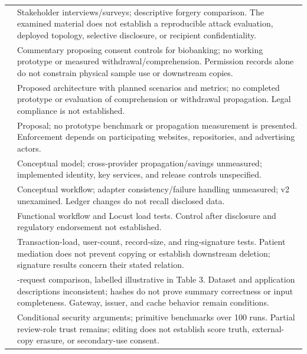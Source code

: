 \begin{longtable}{@{}>{\raggedright\arraybackslash}m{}>{\raggedright\arraybackslash}m{}@{}}
\addlinespace[5pt]
\cite{updateGupta2024CertificatePermission} & Stakeholder interviews/surveys; descriptive forgery comparison. The examined material does not establish a reproducible attack evaluation, deployed topology, selective disclosure, or recipient confidentiality. \\
\addlinespace[5pt]
\cite{updateBarnes2025DemonstratedConsent} & Commentary proposing consent controls for biobanking; no working prototype or measured withdrawal/comprehension. Permission records alone do not constrain physical sample use or downstream copies. \\
\addlinespace[5pt]
\cite{updateBonotis2025CONSENT} & Proposed architecture with planned scenarios and metrics; no completed prototype or evaluation of comprehension or withdrawal propagation. Legal compliance is not established. \\
\addlinespace[5pt]
\cite{updateDauden2025RTBConsent} & Proposal; no prototype benchmark or propagation measurement is presented. Enforcement depends on participating websites, repositories, and advertising actors. \\
\addlinespace[5pt]
\cite{updateObodo2025MultiProviderConsent} & Conceptual model; cross-provider propagation/savings unmeasured; implemented identity, key services, and release controls unspecified. \\
\addlinespace[5pt]
\cite{updateOke2025FHIRConsent} & Conceptual workflow; adapter consistency/failure handling unmeasured; v2 unexamined. Ledger changes do not recall disclosed data. \\
\addlinespace[5pt]
\cite{updateTomaz2025PrivacHer} & Functional workflow and Locust load tests. Control after disclosure and regulatory endorsement not established. \\
\addlinespace[5pt]
\cite{updateQu2025ConsentEMR} & Transaction-load, user-count, record-size, and ring-signature tests. Patient mediation does not prevent copying or establish downstream deletion; signature results concern their stated relation. \\
\addlinespace[5pt]
\cite{updateFerreira2025MCPFHIR} & 300-request comparison, labelled illustrative in Table 3. Dataset and application descriptions inconsistent; hashes do not prove summary correctness or input completeness. Gateway, issuer, and cache behavior remain conditions. \\
\addlinespace[5pt]
\cite{updateLu2025RedactableEducation} & Conditional security arguments; primitive benchmarks over 100 runs. Partial review-role trust remains; editing does not establish score truth, external-copy erasure, or secondary-use consent. \\

\end{longtable}
